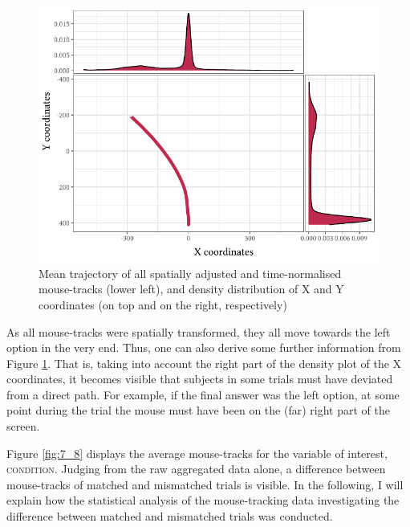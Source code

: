 \begin{figure}
    \centering
    \includegraphics[]{figures/fig7.7.pdf}
    \caption{Mean trajectory of all spatially adjusted and time-normalised mouse-tracks (lower left), and density distribution of X and Y coordinates (on top and on the right, respectively)}
    \label{fig:7_7}
\end{figure}

As all mouse-tracks were spatially transformed, they all move towards the left option in the very end. Thus, one can also derive some further information from Figure \ref{fig:7_7}. That is, taking into account the right part of the density plot of the X coordinates, it becomes visible that subjects in some trials must have deviated from a direct path. For example, if the final answer was the left option, at some point during the trial the mouse must have been on the (far) right part of the screen.

Figure \ref{fig:7_8} displays the average mouse-tracks for the variable of interest, \textsc{condition}. Judging from the raw aggregated data alone, a difference between mouse-tracks of matched and mismatched trials is visible. In the following, I will explain how the statistical analysis of the mouse-tracking data investigating the difference between matched and mismatched trials was conducted.

